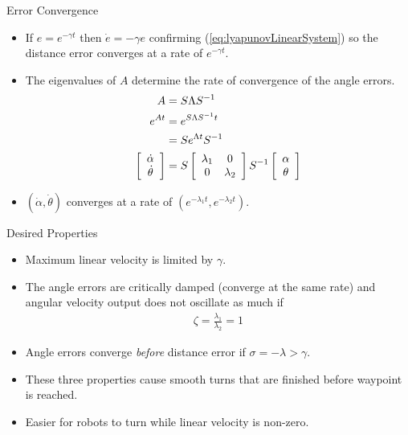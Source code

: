 \documentclass[hyperref={pdfpagelabels=false}]{beamer}
\begin{document}
\begin{frame}{Error Convergence}
\begin{itemize}
\item If $e=e^{-\gamma t}$ then $\dot{e}=-\gamma e$ confirming (\ref{eq:lyapunovLinearSystem}) so the distance error converges at a rate of $e^{-\gamma t}$.
\item The eigenvalues of $A$ determine the rate of convergence of the angle errors.
\begin{align*}
A &= S\Lambda S^{-1} \\
e^{At} &= e^{S\Lambda S^{-1}t} \\
&= Se^{\Lambda t} S^{-1} \\
\left[\begin{array}{c} \dot{\alpha} \\ \dot{\theta} \end{array}\right]
&= S\left[\begin{array}{c c} \lambda_1 & 0 \\ 0 & \lambda_2 \end{array}\right]S^{-1}
\left[\begin{array}{c} \alpha \\ \theta \end{array}\right] \\
\end{align*}
\item $(\dot{\alpha}, \dot{\theta})$ converges at a rate of $(e^{-\lambda_1 t}, e^{-\lambda_2 t})$.
\end{itemize}
\end{frame}

\begin{frame}{Desired Properties}
\begin{itemize}
\item Maximum linear velocity is limited by $\gamma$.
\item The angle errors are critically damped (converge at the same rate) and angular velocity output does not oscillate as much if
\begin{align*}
\zeta = \frac{\lambda_1}{\lambda_2} = 1
\end{align*}
\item Angle errors converge \textit{before} distance error if $\sigma=-\lambda>\gamma$.
\item These three properties cause smooth turns that are finished before waypoint is reached.
\item Easier for robots to turn while linear velocity is non-zero.
\end{itemize}
\end{frame}
\end{document}
